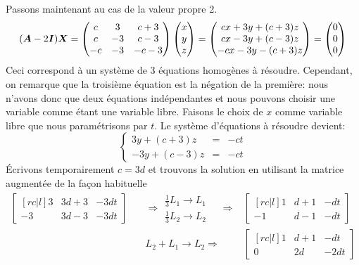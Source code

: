 Passons maintenant au cas de la valeur propre 2.
\[
(\boldsymbol{A} -2\boldsymbol{I})\boldsymbol{X} = \begin{pmatrix}
c & 3 & c+3 \\
c & -3 & c-3 \\
-c & -3 & -c-3
\end{pmatrix}\begin{pmatrix}
x \\ y \\ z
\end{pmatrix}
=
\begin{pmatrix}
cx + 3y + (c+3)z \\
cx - 3y + (c-3)z \\
-cx -3y - (c+3)z
\end{pmatrix}
=
\begin{pmatrix}
0\\ 0\\ 0
\end{pmatrix}
\]
Ceci correspond à un système de 3 équations homogènes à résoudre.  
Cependant, on remarque que la troisième équation est la négation
de la première: nous n'avons donc que deux équations indépendantes
et nous pouvons choisir une variable comme étant une variable libre.
Faisons le choix de $x$ comme variable libre que nous paramétrisons par $t$.
Le système d'équations à résoudre devient:
\[
\left\{
\begin{matrix}
3y + (c+3)z &=& -ct \\
-3y + (c-3)z &=& -ct
\end{matrix}
\right.
\]
Écrivons temporairement $c=3d$ et trouvons la solution en utilisant
la matrice augmentée de la façon habituelle
\[
\begin{matrix}
\begin{bmatrix}[rc|l]
3 & 3d+3 & -3dt\\
-3 & 3d-3 & -3dt
\end{bmatrix}
& \quad\Rightarrow \begin{matrix}
\frac13 L_1 \rightarrow L_1 \\
\frac13 L_2 \rightarrow L_2
\end{matrix}
\quad\Rightarrow & 
\begin{bmatrix}[rc|l]
1 & d+1 & -dt\\
-1 & d-1 & -dt
\end{bmatrix} \\
&\quad L_2 + L_1 \rightarrow L_2 \Rightarrow \quad&
\begin{bmatrix}[rc|l]
1 & d+1 & -dt\\
0 & 2d & -2dt
\end{bmatrix} \\
\end{matrix}
\]
